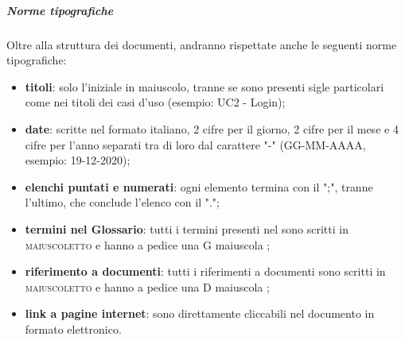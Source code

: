 		\subparagraph{Norme tipografiche}
		Oltre alla struttura dei documenti, andranno rispettate anche le seguenti norme tipografiche:
		\begin{itemize}
			\item \textbf{titoli}: solo l'iniziale in maiuscolo, tranne se sono presenti sigle particolari come nei titoli dei casi d'uso (esempio: UC2 - Login);
			\item \textbf{date}: scritte nel formato italiano, 2 cifre per il giorno, 2 cifre per il mese e 4 cifre per l'anno separati tra di loro dal carattere "-" (GG-MM-AAAA, esempio: 19-12-2020);
			\item \textbf{elenchi puntati e numerati}: ogni elemento termina con il ";", tranne l'ultimo, che conclude l'elenco con il ".";
			\item \textbf{termini nel Glossario}: tutti i termini presenti nel  sono scritti in \textsc{maiuscoletto} e hanno a pedice una G maiuscola \glock{};
			\item \textbf{riferimento a documenti}: tutti i riferimenti a documenti sono scritti in \textsc{maiuscoletto} e hanno a pedice una D maiuscola \dext{};
			\item \textbf{link a pagine internet}: sono direttamente cliccabili nel documento in formato elettronico.
		\end{itemize}

